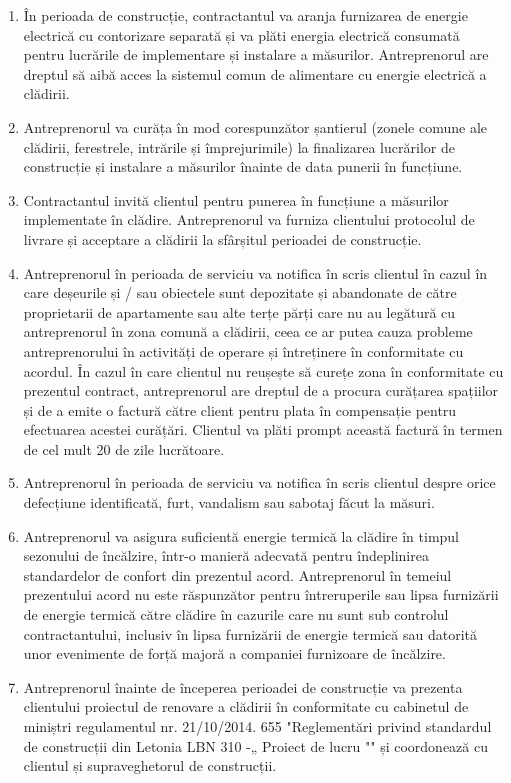 \begin{multicols}{2}
\begin{enumerate}
\item În perioada de construcție, contractantul va aranja furnizarea de energie electrică cu contorizare separată și va plăti energia electrică consumată pentru lucrările de implementare și instalare a măsurilor. Antreprenorul are dreptul să aibă acces la sistemul comun de alimentare cu energie electrică a clădirii.
\item Antreprenorul va curăța în mod corespunzător șantierul (zonele comune ale clădirii, ferestrele, intrările și împrejurimile) la finalizarea lucrărilor de construcție și instalare a măsurilor înainte de data punerii în funcțiune.
\item Contractantul invită clientul pentru punerea în funcțiune a măsurilor implementate în clădire. Antreprenorul va furniza clientului protocolul de livrare și acceptare a clădirii la sfârșitul perioadei de construcție.
\item Antreprenorul în perioada de serviciu va notifica în scris clientul în cazul în care deșeurile și / sau obiectele sunt depozitate și abandonate de către proprietarii de apartamente sau alte terțe părți care nu au legătură cu antreprenorul în zona comună a clădirii, ceea ce ar putea cauza probleme antreprenorului în activități de operare și întreținere în conformitate cu acordul. În cazul în care clientul nu reușește să curețe zona în conformitate cu prezentul contract, antreprenorul are dreptul de a procura curățarea spațiilor și de a emite o factură către client pentru plata în compensație pentru efectuarea acestei curățări. Clientul va plăti prompt această factură în termen de cel mult 20 de zile lucrătoare.
\item Antreprenorul în perioada de serviciu va notifica în scris clientul despre orice defecțiune identificată, furt, vandalism sau sabotaj făcut la măsuri.
\item Antreprenorul va asigura suficientă energie termică la clădire în timpul sezonului de încălzire, într-o manieră adecvată pentru îndeplinirea standardelor de confort din prezentul acord. Antreprenorul în temeiul prezentului acord nu este răspunzător pentru întreruperile sau lipsa furnizării de energie termică către clădire în cazurile care nu sunt sub controlul contractantului, inclusiv în lipsa furnizării de energie termică sau datorită unor evenimente de forță majoră a companiei furnizoare de încălzire.
\item Antreprenorul înainte de începerea perioadei de construcție va prezenta clientului proiectul de renovare a clădirii în conformitate cu cabinetul de miniștri regulamentul nr. 21/10/2014. 655 "Reglementări privind standardul de construcții din Letonia LBN 310 -„ Proiect de lucru "" și coordonează cu clientul și supraveghetorul de construcții.

\end{enumerate}
\end{multicols}
